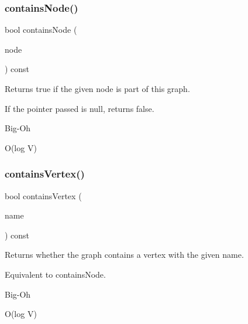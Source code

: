 \subsubsection{\texorpdfstring{contains\+Node()}{containsNode()}\hspace{0.1cm}{\footnotesize\ttfamily [2/2]}}
{\footnotesize\ttfamily bool contains\+Node (\begin{DoxyParamCaption}\item[{\mbox{\hyperlink{classVertexGen}{Vertex\+Gen}}$<$ V, E $>$  $\ast$}]{node }\end{DoxyParamCaption}) const\hspace{0.3cm}{\ttfamily [inherited]}}



Returns true if the given node is part of this graph. 

If the pointer passed is null, returns false. \begin{DoxyRefDesc}{Big-\/\+Oh}
\item[\mbox{\hyperlink{BigOh__BigOh000057}{Big-\/\+Oh}}]O(log V) \end{DoxyRefDesc}
\mbox{\label{classBasicGraphGen_ab6062ac98f3491a525e0809c5b03b7cf}} 
\subsubsection{\texorpdfstring{contains\+Vertex()}{containsVertex()}\hspace{0.1cm}{\footnotesize\ttfamily [1/2]}}
{\footnotesize\ttfamily bool contains\+Vertex (\begin{DoxyParamCaption}\item[{const std\+::string \&}]{name }\end{DoxyParamCaption}) const}



Returns whether the graph contains a vertex with the given name. 

Equivalent to contains\+Node. \begin{DoxyRefDesc}{Big-\/\+Oh}
\item[\mbox{\hyperlink{BigOh__BigOh000014}{Big-\/\+Oh}}]O(log V) \end{DoxyRefDesc}
\mbox{\label{classBasicGraphGen_a37d4f31bc5bb6397fdb0bf966b54ca3f}} 
